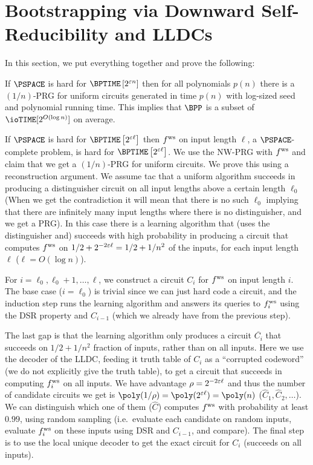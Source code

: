 \section{Bootstrapping via Downward Self-Reducibility and LLDCs}
In this section, we put everything together and prove the following:
\begin{theorem}
	If $\PSPACE$ is hard for $\BPTIME\left[2^{\eps n}\right]$ then for all polynomials $p(n)$ there is a $(1/n)$-PRG for uniform circuits generated in time $p(n)$ with log-sized seed and polynomial running time. This implies that $\BPP$ is a subset of $\ioTIME[2^{O(\log n)}]$ on average.
\end{theorem}


If $\PSPACE$ is hard for $\BPTIME\left[2^{\eps \ell}\right]$ then $ f^{\text{ws}} $ on input length $\ell$, a $\PSPACE$-complete problem, is hard for $\BPTIME\left[2^{\eps \ell}\right]$. 
We use the NW-PRG with $ f^{\text{ws}} $ and claim that we get a $(1/n)$-PRG for uniform circuits. We prove this using a reconstruction argument. 
We assume tac that a uniform algorithm succeeds in producing a distinguisher circuit on all input lengths above a certain length $\ell_0$ (When we get the contradiction it will mean that there is no such $\ell_0$ implying that there are infinitely many input lengths where there is no distinguisher, and we get a PRG). In this case there is a learning algorithm that (uses the distinguisher and) succeeds with high probability in producing a circuit that computes $ f^{\text{ws}} $ on $1/2+2^{-2\varepsilon \ell} = 1/2+1/n^2$ of the inputs, for each input length $\ell$ ($\ell=O(\log n )$). 

For $i=\ell_0,\ell_0+1,\ldots,\ell$, we construct a circuit $C_i$ for $ f^{\text{ws}} $ on input length $i$. The base case ($i=\ell_0$) is trivial since we can just hard code a circuit, and the induction step runs the learning algorithm and answers its queries to $ f^{\text{ws}} _i$ using the DSR property and $C_{i-1}$ (which we already have from the previous step). 

The last gap is that the learning algorithm only produces a circuit $\overline{C_i}$ that succeeds on $1/2+1/n^2$ fraction of inputs, rather than on all inputs. Here we use the decoder of the LLDC, feeding it truth table of $C_i$ as a ``corrupted codeword'' (we do not explicitly give the truth table), to get a circuit that succeeds in computing $ f^{\text{ws}} _i$ on all inputs. We have advantage $\rho = 2^{-2\varepsilon \ell}$ and thus the number of candidate circuits we get is $\poly(1/\rho) = \poly(2^{\eps \ell}) = \poly(n)$ ($\hat{C}_1,\hat{C}_2,\ldots$).
We can distinguish which one of them ($\hat{C}$) computes $ f^{\text{ws}} $ with probability at least $0.99$, using random sampling (i.e.\, evaluate each candidate on random inputs, evaluate $ f^{\text{ws}} _i$ on these inputs using DSR and $C_{i-1}$, and compare). The final step is to use the local unique decoder to get the exact circuit for $C_i$ (succeeds on all inputs). 


